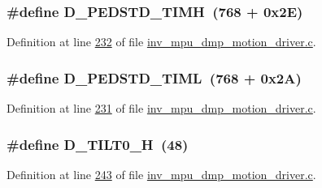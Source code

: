 \subsubsection[{\texorpdfstring{D\+\_\+\+P\+E\+D\+S\+T\+D\+\_\+\+T\+I\+MH}{D_PEDSTD_TIMH}}]{\setlength{\rightskip}{0pt plus 5cm}\#define D\+\_\+\+P\+E\+D\+S\+T\+D\+\_\+\+T\+I\+MH~(768 + 0x2\+E)}\hypertarget{group___d_r_i_v_e_r_s_ga3c410f5ee95cf78486e71a276ed8b36a}{}\label{group___d_r_i_v_e_r_s_ga3c410f5ee95cf78486e71a276ed8b36a}


Definition at line \hyperlink{inv__mpu__dmp__motion__driver_8c_source_l00232}{232} of file \hyperlink{inv__mpu__dmp__motion__driver_8c_source}{inv\+\_\+mpu\+\_\+dmp\+\_\+motion\+\_\+driver.\+c}.

\subsubsection[{\texorpdfstring{D\+\_\+\+P\+E\+D\+S\+T\+D\+\_\+\+T\+I\+ML}{D_PEDSTD_TIML}}]{\setlength{\rightskip}{0pt plus 5cm}\#define D\+\_\+\+P\+E\+D\+S\+T\+D\+\_\+\+T\+I\+ML~(768 + 0x2\+A)}\hypertarget{group___d_r_i_v_e_r_s_ga1968b4f2f2daece7e19a24bad6388864}{}\label{group___d_r_i_v_e_r_s_ga1968b4f2f2daece7e19a24bad6388864}


Definition at line \hyperlink{inv__mpu__dmp__motion__driver_8c_source_l00231}{231} of file \hyperlink{inv__mpu__dmp__motion__driver_8c_source}{inv\+\_\+mpu\+\_\+dmp\+\_\+motion\+\_\+driver.\+c}.

\subsubsection[{\texorpdfstring{D\+\_\+\+T\+I\+L\+T0\+\_\+H}{D_TILT0_H}}]{\setlength{\rightskip}{0pt plus 5cm}\#define D\+\_\+\+T\+I\+L\+T0\+\_\+H~(48)}\hypertarget{group___d_r_i_v_e_r_s_ga214de0f949e6ed8fcf11ce1b3b6eebad}{}\label{group___d_r_i_v_e_r_s_ga214de0f949e6ed8fcf11ce1b3b6eebad}


Definition at line \hyperlink{inv__mpu__dmp__motion__driver_8c_source_l00243}{243} of file \hyperlink{inv__mpu__dmp__motion__driver_8c_source}{inv\+\_\+mpu\+\_\+dmp\+\_\+motion\+\_\+driver.\+c}.


